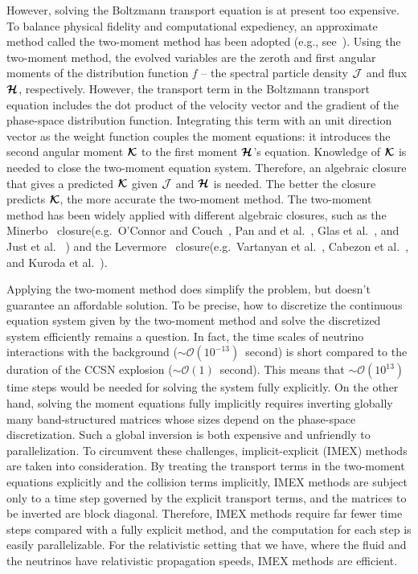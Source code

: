 However, solving the Boltzmann transport equation is at present too expensive.
To balance physical fidelity and computational expediency, an approximate method called the two-moment method has been adopted 
(e.g., see~\cite{kuroda_etal_2016,roberts_etal_2016,just_etal_2018,vartanyan_etal_2018}).
Using the two-moment method, the evolved variables are the zeroth and first angular moments of the distribution function $f$ -- the spectral particle density $\mathcal{J}$ and flux $\boldsymbol{\mathcal{H}}$, respectively.
However, the transport term in the Boltzmann transport equation includes the dot product of the velocity vector and the gradient of the phase-space distribution function.
Integrating this term with an unit direction vector as the weight function couples the moment equations: it introduces the second angular moment $\boldsymbol{\mathcal{K}}$ to the first moment $\boldsymbol{\mathcal{H}}$'s equation.
Knowledge of $\boldsymbol{\mathcal{K}}$ is needed to close the two-moment equation system.
Therefore, an algebraic closure that gives a predicted $\boldsymbol{\mathcal{K}}$ given $\mathcal{J}$ and $\boldsymbol{\mathcal{H}}$ is needed.
The better the closure predicts $\boldsymbol{\mathcal{K}}$, the more accurate the two-moment method. 
The two-moment method has been widely applied with different algebraic closures, such as the Minerbo~\cite{minerbo_1978} closure(e.g.~{O'Connor} and {Couch}~\cite{oConnorCouch_2018}, Pan and et al.~\cite{pan_etal_2018}, Glas et al.~\cite{glas_etal_2018}, and Just et al.~\cite{just_etal_2018} ) and the Levermore~\cite{levermore_1984} closure(e.g.~Vartanyan et al.~\cite{vartanyan_etal_2018}, Cabezon et al.~\cite{cabezon_etal_2018}, and Kuroda et al.~\cite{kuroda_etal_2016}). 

Applying the two-moment method does simplify the problem, but doesn't guarantee an affordable solution.
To be precise, how to discretize the continuous equation system given by the two-moment method and solve the discretized system efficiently remains a question.
In fact, the time scales of neutrino interactions with the background ($\sim\mathcal{O}(10^{-13})$~second) is short compared to the duration of the CCSN explosion ($\sim\mathcal{O}(1)$~second).  
This means that $\sim\mathcal{O}(10^{13})$ time steps would be needed for solving the system fully explicitly. 
On the other hand, solving the moment equations fully implicitly requires inverting globally many band-structured matrices whose sizes depend on the phase-space discretization.
Such a global inversion is both expensive and unfriendly to parallelization.
To circumvent these challenges, implicit-explicit (IMEX) methods are taken into consideration.
By treating the transport terms in the two-moment equations explicitly and the collision terms implicitly, IMEX methods are subject only to a time step governed by the explicit transport terms, and the matrices to be inverted are block diagonal.
Therefore, IMEX methods require far fewer time steps compared with a fully explicit method, and the computation for each step is easily parallelizable.  
For the relativistic setting that we have, where the fluid and the neutrinos have relativistic propagation speeds, IMEX methods are efficient.

